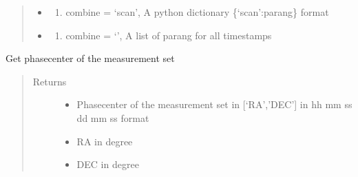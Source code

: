 \documentclass[letterpaper,10pt,english]{sphinxmanual}
\begin{document}
\begin{fulllineitems}
\begin{fulllineitems}
\begin{quote}
\begin{description}
\begin{itemize}
\begin{enumerate}
\end{enumerate}

\item {} 
\sphinxAtStartPar
{} \textendash{}
\begin{enumerate}
%
\setcounter{enumi}{1}
\item {} 
\sphinxAtStartPar
combine = ‘scan’, A python dictionary \{‘scan’:parang\} format

\end{enumerate}

\item {} 
\sphinxAtStartPar
{} \textendash{}
\begin{enumerate}
%
\setcounter{enumi}{2}
\item {} 
\sphinxAtStartPar
combine = ‘’, A list of parang for all timestamps

\end{enumerate}

\end{itemize}


\end{description}\end{quote}

\end{fulllineitems}


\begin{fulllineitems}
\label{\detokenize{paircars:paircars.access_ms.AccessMS.get_phasecenter}}
\sphinxAtStartPar
Get phasecenter of the measurement set
\begin{quote}\begin{description}
\item[{Returns}] \leavevmode
\sphinxAtStartPar
\begin{itemize}
\item {} 
\sphinxAtStartPar
{} \textendash{} Phasecenter of the measurement set in {[}‘RA’,’DEC’{]} in hh mm ss dd mm ss format

\item {} 
\sphinxAtStartPar
{} \textendash{} RA in degree

\item {} 
\sphinxAtStartPar
{} \textendash{} DEC in degree


\end{itemize}
\end{description}
\end{quote}
\end{fulllineitems}
\end{fulllineitems}
\end{document}
